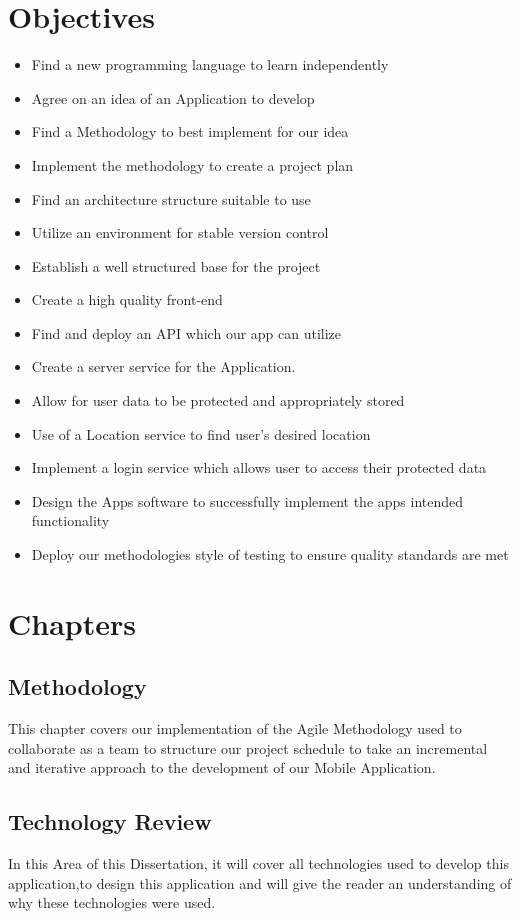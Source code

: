 \section{Objectives}
\begin{itemize}
    \item Find a new programming language to learn independently
    \item Agree on an idea of an Application to develop
    \item Find a Methodology to best implement for our idea
    \item Implement the methodology to create a project plan
    \item Find an architecture structure suitable to use
    \item Utilize an environment for stable version control
    \item Establish a well structured base for the project
    \item Create a high quality front-end
    \item Find and deploy an API which our app can utilize
    \item Create a server service for the Application.
    \item Allow for user data to be protected and appropriately stored
    \item Use of a Location service to find user's desired location
    \item Implement a login service which allows user to access their protected data
    \item Design the Apps software to successfully implement the apps intended functionality
    \item Deploy our methodologies style of testing to ensure quality standards are met

\end{itemize}
\section{Chapters}
\subsection{Methodology}
This chapter covers our implementation of the Agile Methodology used to collaborate as a team to structure our project schedule to take an incremental and iterative approach to the development of our Mobile Application.
\subsection{Technology Review}
In this Area of this Dissertation, it will cover all technologies used to develop this application,to design this application and will give the reader an understanding of why these technologies were used.
